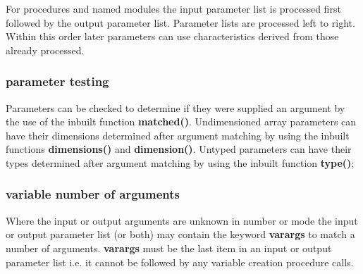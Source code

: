                 For procedures and named modules the input parameter list is
                processed first followed by the output parameter list.
                Parameter lists are processed left to right. Within this order
                later parameters can use characteristics derived from those
                already processed.

            \subsubsection{parameter testing}

                Parameters can be checked to determine if they were supplied an
                argument by the use of the inbuilt function {\bf matched()}.
                Undimensioned array parameters can have their dimensions
                determined after argument matching by using the inbuilt
                functions {\bf dimensions()} and {\bf dimension()}. Untyped
                parameters can have their types determined after argument
                matching by using the inbuilt function {\bf type()};

            \subsubsection{variable number of arguments}\label{sec:varargs}

                Where the input or output arguments are unknown in number or mode
                the input or output parameter list (or both) may contain the
                keyword {\bf varargs} to match a number of arguments. {\bf
                varargs} must be the last item in an input or output parameter
                list i.e. it cannot be followed by any variable
                creation procedure calls.

